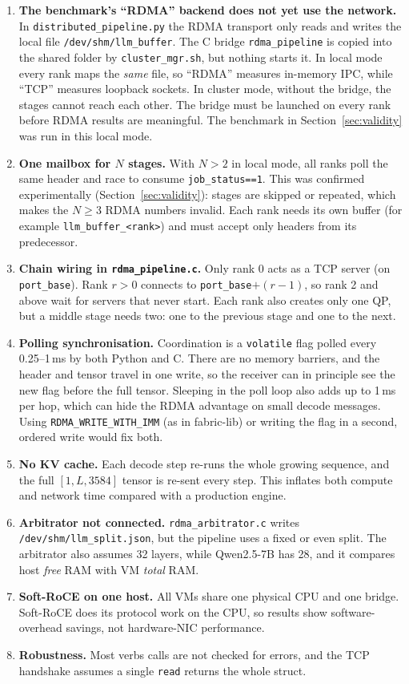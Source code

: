 \documentclass[11pt,a4paper]{article}
\begin{document}
\begin{enumerate}[leftmargin=*]
  \item \textbf{The benchmark's ``RDMA'' backend does not yet use the network.} In \texttt{distributed\_pipeline.py} the RDMA transport only reads and writes the local file \texttt{/dev/shm/llm\_buffer}. The C bridge \texttt{rdma\_pipeline} is copied into the shared folder by \texttt{cluster\_mgr.sh}, but nothing starts it. In local mode every rank maps the \emph{same} file, so ``RDMA'' measures in-memory IPC, while ``TCP'' measures loopback sockets. In cluster mode, without the bridge, the stages cannot reach each other. The bridge must be launched on every rank before RDMA results are meaningful. The benchmark in Section~\ref{sec:validity} was run in this local mode.
  \item \textbf{One mailbox for $N$ stages.} With $N>2$ in local mode, all ranks poll the same header and race to consume \texttt{job\_status==1}. This was confirmed experimentally (Section~\ref{sec:validity}): stages are skipped or repeated, which makes the $N \ge 3$ RDMA numbers invalid. Each rank needs its own buffer (for example \texttt{llm\_buffer\_<rank>}) and must accept only headers from its predecessor.
  \item \textbf{Chain wiring in \texttt{rdma\_pipeline.c}.} Only rank 0 acts as a TCP server (on \texttt{port\_base}). Rank $r>0$ connects to \texttt{port\_base}$+(r-1)$, so rank 2 and above wait for servers that never start. Each rank also creates only one QP, but a middle stage needs two: one to the previous stage and one to the next.
  \item \textbf{Polling synchronisation.} Coordination is a \texttt{volatile} flag polled every 0.25--1\,ms by both Python and C. There are no memory barriers, and the header and tensor travel in one write, so the receiver can in principle see the new flag before the full tensor. Sleeping in the poll loop also adds up to 1\,ms per hop, which can hide the RDMA advantage on small decode messages. Using \texttt{RDMA\_WRITE\_WITH\_IMM} (as in fabric-lib) or writing the flag in a second, ordered write would fix both.
  \item \textbf{No KV cache.} Each decode step re-runs the whole growing sequence, and the full $[1, L, 3584]$ tensor is re-sent every step. This inflates both compute and network time compared with a production engine.
  \item \textbf{Arbitrator not connected.} \texttt{rdma\_arbitrator.c} writes \texttt{/dev/shm/llm\_split.json}, but the pipeline uses a fixed or even split. The arbitrator also assumes 32 layers, while Qwen2.5-7B has 28, and it compares host \emph{free} RAM with VM \emph{total} RAM.
  \item \textbf{Soft-RoCE on one host.} All VMs share one physical CPU and one bridge. Soft-RoCE does its protocol work on the CPU, so results show software-overhead savings, not hardware-NIC performance.
  \item \textbf{Robustness.} Most verbs calls are not checked for errors, and the TCP handshake assumes a single \texttt{read} returns the whole struct.
\end{enumerate}
\end{document}
